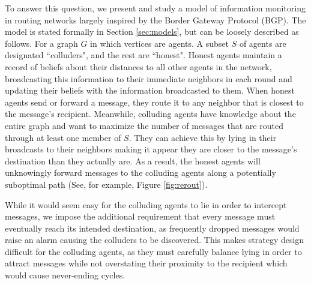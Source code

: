 \documentclass{comnet}
\begin{document}
To answer this question, we present and study a model of information monitoring in routing networks largely inspired by the Border Gateway Protocol (BGP). The model is stated formally in Section \ref{sec:models}, but can be loosely described as follows. For a graph $G$ in which vertices are agents. A subset $S$ of agents are designated ``colluders", and the rest are ``honest". Honest agents maintain a record of beliefs about their distances to all other agents in the network, broadcasting this information to their immediate neighbors in each round and updating their beliefs with the information broadcasted to them. When honest agents send or forward a message, they route it to any neighbor that is closest to the message's recipient. Meanwhile, colluding agents have knowledge about the entire graph and want to maximize the number of messages that are routed through at least one member of $S$. They can achieve this by lying in their broadcasts to their neighbors making it appear they are closer to the message's destination than they actually are. As a result, the honest agents will unknowingly forward messages to the colluding agents along a potentially suboptimal path (See, for example, Figure \ref{fig:rerout}).

While it would seem easy for the colluding agents to lie in order to intercept messages, we impose the additional requirement that every message must eventually reach its intended destination, as frequently dropped messages would raise an alarm causing the colluders to be discovered. This makes strategy design difficult for the colluding agents, as they must carefully balance lying in order to attract messages while not overstating their proximity to the recipient which would cause never-ending cycles. 
\end{document}
